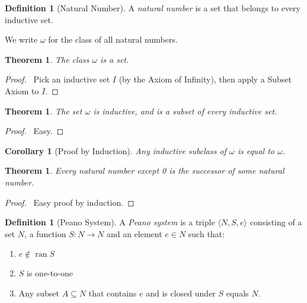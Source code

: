 \documentclass{article}
\let\qed\relax
\newtheorem{theorem}[axiom]{Theorem}
\newtheorem{corollary}{Corollary}[axiom]
\theoremstyle{definition}
\newtheorem{definition}[axiom]{Definition}
\newcommand{\ran}{\ensuremath{\operatorname{ran}}}
\begin{document}
    \begin{definition}[Natural Number]
        A \emph{natural number} is a set that belongs to every inductive set.

        We write $\omega$ for the class of all natural numbers.
    \end{definition}

    \begin{theorem}
        The class $\omega$ is a set.
    \end{theorem}

    \begin{proof}
        \pf\ Pick an inductive set $I$ (by the Axiom of Infinity), then apply a Subset Axiom to $I$. \qed
    \end{proof}

    \begin{theorem}
        The set $\omega$ is inductive, and is a subset of every inductive set.
    \end{theorem}

    \begin{proof}
        \pf\ Easy. \qed
    \end{proof}

    \begin{corollary}[Proof by Induction]
        Any inductive subclass of $\omega$ is equal to $\omega$.
    \end{corollary}

    \begin{theorem}
        Every natural number except 0 is the successor of some natural number.
    \end{theorem}

    \begin{proof}
        \pf\ Easy proof by induction. \qed
    \end{proof}

    \begin{definition}[Peano System]
        A \emph{Peano system} is a triple $\langle N, S, e \rangle$ consisting of a set $N$,
        a function $S : N \rightarrow N$ and an element $e \in N$ such that:
        \begin{enumerate}
            \item $e \notin \ran S$
            \item $S$ is one-to-one
            \item Any subset $A \subseteq N$ that contains $e$ and is closed under $S$ equals $N$.
        \end{enumerate}
    \end{definition}
\end{document}
